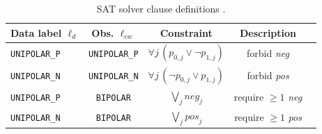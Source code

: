 \begin{table}[t!]
	\centering
	\caption{SAT solver clause definitions \label{tab:polarity-clauses}.}
	\renewcommand{\arraystretch}{1.1}
	\setlength{\tabcolsep}{3pt}
	\begin{tabular*}{\linewidth}{@{\extracolsep{\fill}}lcccc@{}}
		\toprule
		\textbf{Data label} $\ell_d$ & \textbf{Obs.} $\ell_{cw}$ & \textbf{Constraint} & \textbf{Description} \\
		\midrule
		\texttt{UNIPOLAR\_P} & \texttt{UNIPOLAR\_P} & $\forall j\, (p_{0,j}\vee\neg p_{1,j})$  & forbid \emph{neg}  \\
		\texttt{UNIPOLAR\_N} & \texttt{UNIPOLAR\_N} & $\forall j\, (\neg p_{0,j}\vee p_{1,j})$ & forbid \emph{pos} \\
		\texttt{UNIPOLAR\_P} & \texttt{BIPOLAR}     & $\bigvee_j \textit{neg}_j$               & require $\ge1$ \emph{neg}  \\
		\texttt{UNIPOLAR\_N} & \texttt{BIPOLAR}     & $\bigvee_j \textit{pos}_j$               & require $\ge1$ \emph{pos}  \\
		\bottomrule
	\end{tabular*}
\end{table}